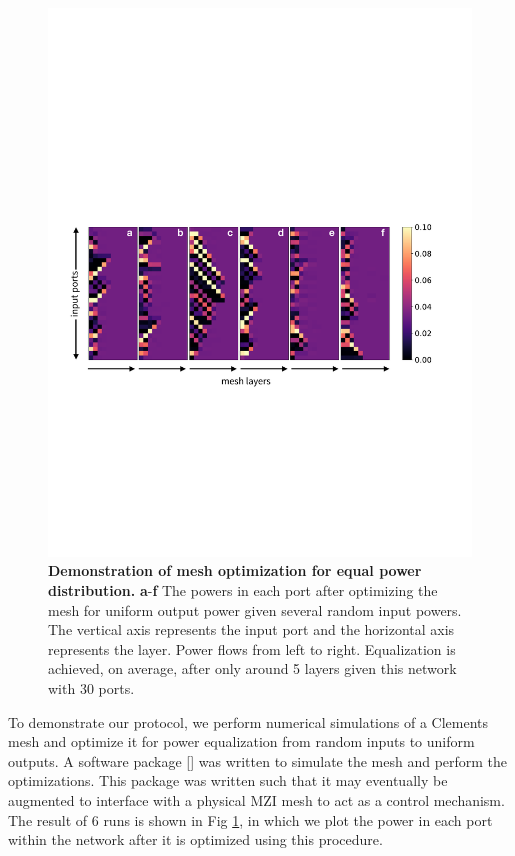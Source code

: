 \documentclass[%
 reprint,
 amsmath,amssymb,
 aps,
prstab,
floatfix,
]{revtex4-1}
\begin{document}
\begin{figure}
\includegraphics[width=1\columnwidth]{Fig4.pdf}
\caption{\label{fig:equalization} \textbf{Demonstration of mesh optimization for equal power distribution.} \textbf{a}-\textbf{f} The powers in each port after optimizing the mesh for uniform output power given several random input powers.  The vertical axis represents the input port and the horizontal axis represents the layer.  Power flows from left to right.  Equalization is achieved, on average, after only around 5 layers given this network with 30 ports.}
\end{figure}

To demonstrate our protocol, we perform numerical simulations of a Clements mesh and optimize it for power equalization from random inputs to uniform outputs. A software package [] was written to simulate the mesh and perform the optimizations. This package was written such that it may eventually be augmented to interface with a physical MZI mesh to act as a control mechanism.  The result of 6 runs is shown in Fig \ref{fig:equalization}, in which we plot the power in each port within the network after it is optimized using this procedure.
\end{document}
